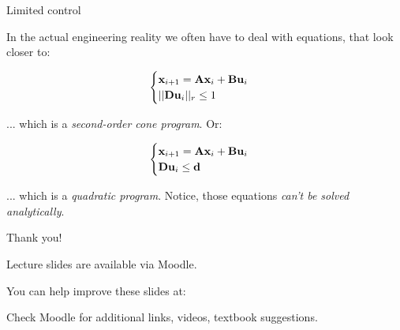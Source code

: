 \documentclass{beamer}
\begin{document}
\begin{frame}{Limited control}
\begin{flushleft}

In the actual engineering reality we often have to deal with equations, that look closer to:

\begin{equation}
\begin{cases}
\mathbf{x}_{i+1} = \mathbf{A}  \mathbf{x}_i + \mathbf{B} \mathbf{u}_i \\
|| \mathbf{D} \mathbf{u}_i ||_r \leq 1
\end{cases}
\end{equation}

... which is a \emph{second-order cone program}. Or:

\begin{equation}
\begin{cases}
\mathbf{x}_{i+1} = \mathbf{A}  \mathbf{x}_i + \mathbf{B} \mathbf{u}_i \\
\mathbf{D} \mathbf{u}_i \leq \mathbf{d}
\end{cases}
\end{equation}

... which is a \emph{quadratic program}. Notice, those equations \emph{can't be solved analytically}.

\end{flushleft}
\end{frame}





\begin{frame}{Thank you!}
	\centerline{Lecture slides are available via Moodle.}
	\bigskip
	\centerline{You can help improve these slides at:}
	\centerline{\mygit}
	\bigskip
	\centerline{Check Moodle for additional links, videos, textbook suggestions.}
	\bigskip
	
	\centerline{\textcolor{black}{}}
\end{frame}
\end{document}
